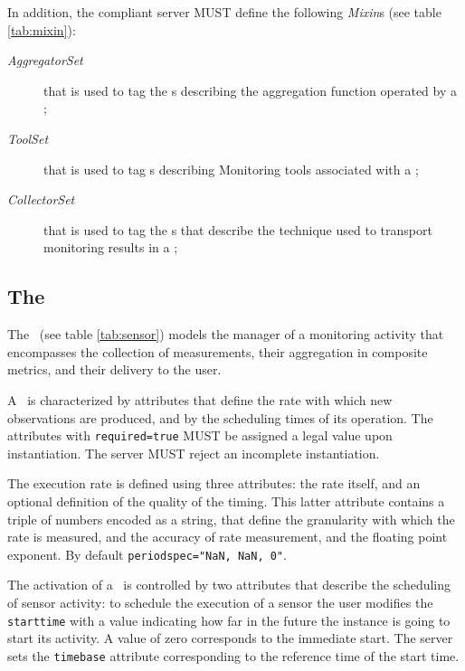\documentclass[12pt]{article}  %
\begin{document}
{\begin{description}
\end{description}

In addition, the compliant server MUST define the following {\em Mixin}s (see table \ref{tab:mixin}): 

\begin{description}

\item [{\em AggregatorSet}] that is used to tag the \mi s describing the aggregation function operated by a \sens;

\item [{\em ToolSet}] that is used to tag \mi s describing Monitoring tools associated with a \coll;

\item [{\em CollectorSet}] that is used to tag the \mi s that describe the technique used to transport monitoring results in a \coll;

\end{description}



\subsection{The \sens \label{sec:sensor}}



The \sens\ (see table \ref{tab:sensor}) models the manager of a monitoring activity that encompasses the collection of measurements, their aggregation in composite metrics, and their delivery to the user.

A \sens\ is characterized by attributes that define the rate with which new observations are produced, and by the scheduling times of its operation. The attributes with \verb|required=true| MUST be assigned a legal value upon instantiation. The server MUST reject an incomplete instantiation.

The execution rate is defined using three attributes: the rate itself, and an optional definition of the quality of the timing. This latter attribute contains a triple of numbers encoded as a string, that define the granularity with which the rate is measured, and the accuracy of rate measurement, and the floating point exponent. By default \verb|periodspec="NaN, NaN, 0"|.

The activation of a \sens\ is controlled by two attributes that describe the scheduling of sensor activity: to schedule the execution of a sensor the user modifies the {\tt starttime} with a value indicating how far in the future the instance is going to start its activity. A value of zero corresponds to the immediate start. The server sets the {\tt timebase} attribute corresponding to the reference time of the start time.

}
\end{document}
